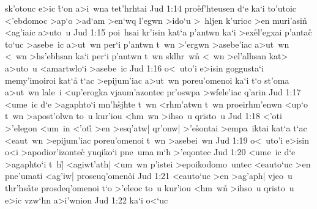 sk'otouc
e>ic
\r{t}`on
a>i~wna
tet'hrhtai\bibvsend
\vs Jud 1:14
pro\r{e}f'hteusen
d`e
ka`i
to'utoic
<'ebdomoc
>ap`o
>ad`am
>en`wq
l'egwn
>ido`u
>~hljen
k'urioc
>en
muri'asin\r{}
<ag'iaic
a>uto~u\bibvsend
\vs Jud 1:15
poi~hsai
kr'isin
kat`a
p'antwn
ka`i
>ex\r{e}l'egxai
p'antac\r{}
to`uc
>asebe~ic
a>ut~wn
per`i
p'antwn
t~wn
>'ergwn
>asebe'iac
a>ut~wn
<~wn
>hs'ebhsan
ka`i
per`i
p'antwn
t~wn
sklhr~w\r{n}
<~wn
>el'alhsan
kat>
a>uto~u
<amartwlo`i
>asebe~ic\bibvsend
\vs Jud 1:16
o<~uto'i
e>isin
goggusta`i
memy'imoiroi
kat`a\r{}
t`ac
>epijum'iac
a>ut~wn
poreu'omenoi
ka`i
t`o
st'oma
a>ut~wn
lale~i
<up'erogka
vjaum'azontec
pr'oswpa
>wfele'iac
q'arin\bibvsend
\vs Jud 1:17
<ume~ic
d`e
>agaphto`i
mn'h\r{s}jhte
t~wn
<rhm'atwn
t~wn
proeirhm'enwn
<up`o
t~wn
>apost'olwn
to~u
kur'iou
<hm~wn
>ihso~u
qristo~u\bibvsend
\vs Jud 1:18
<'oti
>'elegon
<um~in
<'oti\r{}
>en
>esq'atw|
qr'onw|
>'e\r{s}ontai
>empa~iktai
kat`a
t`ac
<eaut~wn
>epijum'iac
poreu'omenoi
t~wn
>asebei~wn\bibvsend
\vs Jud 1:19
o<~uto'i
e>isin
o<i
>apodior'izonte\r{c}
yuqiko`i
pne~uma
m`h
>'eqontec\bibvsend
\vs Jud 1:20
<ume~ic
d`e
>agaphto`i
t~h|\r{}
<agiwt'ath|
<um~wn
p'istei
>epoikodomo~untec
<eauto`uc
>en
pne'umati
<ag'iw|
proseuq'omen\r{o}i\bibvsend
{}
\vs Jud 1:21
<eauto`uc
>en
>ag'aph|
vjeo~u
thr'hs\r{a}te
prosdeq'omenoi
t`o
>'eleoc
to~u
kur'iou
<hm~wn\r{}
>ihso~u
qristo~u
e>ic
vzw`hn
a>i'wnion\bibvsend
\vs Jud 1:22
ka`i
o<`uc
